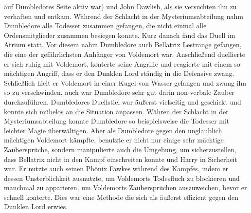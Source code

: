 \documentclass[a4paper, 10pt]{article}
\begin{document}
auf Dumbledores Seite aktiv war) und John Dawlish, als sie versuchten ihn zu verhaften und entkam. Während der Schlacht in der Mysteriumsabteilung nahm Dumbledore alle Todesser zusammen gefangen, die nicht einmal alle Ordensmitglieder zusammen besiegen konnte. Kurz danach fand das Duell im Atrium statt. Vor diesem nahm Dumbledore auch Bellatrix Lestrange gefangen, die eine der gefährlichsten Anhänger von Voldemort war. Anschließend duellierte er sich ruhig mit Voldemort, konterte seine Angriffe und reagierte mit einem so mächtigen Angriff, dass er den Dunklen Lord ständig in die Defensive zwang. Schließlich hielt er Voldemort in einer Kugel von Wasser gefangen und zwang ihn so zu verschwinden. auch war Dumbledore sehr gut darin non-verbale Zauber durchzuführen. Dumbledores Duellstiel war äußerst vielseitig und geschickt und konnte sich mühelos an die Situation anpassen. Währen der Schlacht in der Mysteriumsabteilung konnte Dumbledore so beispielsweise die Todesser mit leichter Magie überwältigen. Aber als Dumbledore gegen den unglaublich mächtigen Voldemort kämpfte, benutzte er nicht nur einige sehr mächtige Zaubersprüche, sondern manipulierte auch die Umgebung, um sicherzustellen, dass Bellatrix nicht in den Kampf einschreiten konnte und Harry in Sicherheit war. Er nutzte auch seinen Phönix Fawkes während des Kampfes, indem er dessen Unsterblichkeit ausnutzte, um Voldemorts Todesfluch zu blockieren und manchmal zu apparieren, um Voldemorts Zaubersprüchen auszuweichen, bevor er schnell konterte. Dies war eine Methode die sich als äußerst effizient gegen den Dunklen Lord erwies.
\end{document}

